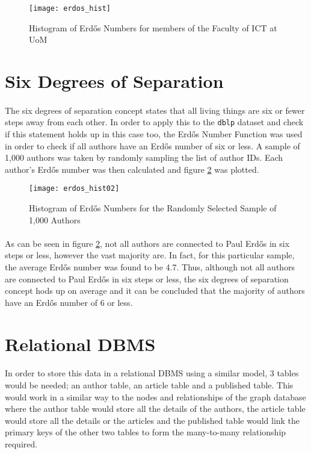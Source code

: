 \begin{figure}[!t]
	\centering
	\texttt{[image: erdos\_hist]}
	\caption[Erd\H{o}s Numbers Histogram]{ Histogram of Erd\H{o}s Numbers for members of the Faculty of ICT at UoM}
	\label{fig::hist_erdos}
\end{figure}

\section{Six Degrees of Separation}
\paragraph{ }The six degrees of separation concept states that all living things are six or fewer steps away from each other. In order to apply this to the \texttt{dblp} dataset and check if this statement holds up in this case too, the Erd\H{o}s Number Function was used in order to check if all authors have an Erd\H{o}s number of six or less. A sample of 1,000 authors was taken by randomly sampling the list of author IDs. Each author's Erd\H{o}s number was then calculated and figure \ref{fig::six_degrees} was plotted.

\begin{figure}[!b]
	\centering
	\texttt{[image: erdos\_hist02]}
	\caption[Erd\H{o}s Numbers Histogram 2]{ Histogram of Erd\H{o}s Numbers for the Randomly Selected Sample of 1,000 Authors}
	\label{fig::six_degrees}
\end{figure}

\paragraph{ }As can be seen in figure \ref{fig::six_degrees}, not all authors are connected to Paul Erd\H{o}s in six steps or less, however the vast majority are. In fact, for this particular sample, the average Erd\H{o}s number was found to be 4.7. Thus, although not all authors are connected to Paul Erd\H{o}s in six steps or less, the six degrees of separation concept hods up on average and it can be concluded that the majority of authors have an Erd\H{o}s number of 6 or less.

\section{Relational DBMS}
\paragraph{ }In order to store this data in a relational DBMS using a similar model, 3 tables would be needed; an author table, an article table and a published table. This would work in a similar way to the nodes and relationships of the graph database where the author table would store all the details of the authors, the article table would store all the details or the articles and the published table would link the primary keys of the other two tables to form the many-to-many relationship required.

